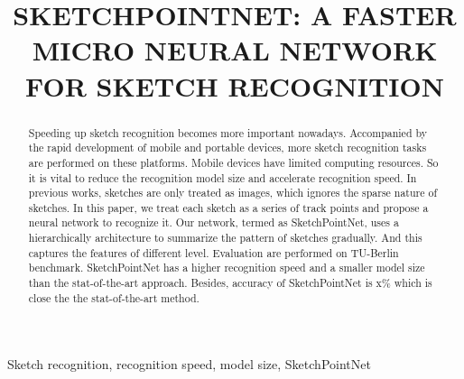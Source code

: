 \documentclass{article}
\title{SKETCHPOINTNET: A FASTER MICRO NEURAL NETWORK FOR SKETCH RECOGNITION}
\begin{document}
%
\maketitle
%
\begin{abstract}
Speeding up sketch recognition becomes more important nowadays. Accompanied by the rapid development of mobile and portable devices, more sketch recognition tasks are performed on these platforms. Mobile devices have limited computing resources. So it is vital to reduce the recognition model size and accelerate recognition speed. In previous works, sketches are only treated as images, which ignores the sparse nature of sketches. In this paper, we treat each sketch as a series of track points and propose a neural network to recognize it. Our network, termed as SketchPointNet, uses a hierarchically architecture to summarize the pattern of sketches gradually. And this captures the features of different level. Evaluation are performed on TU-Berlin benchmark. SketchPointNet has a higher recognition speed and a smaller model size than the stat-of-the-art approach. Besides, accuracy of SketchPointNet is x\% which is close the the stat-of-the-art method.
\end{abstract}

\begin{keywords}
Sketch recognition, recognition speed, model size, SketchPointNet
\end{keywords}








\end{document}
